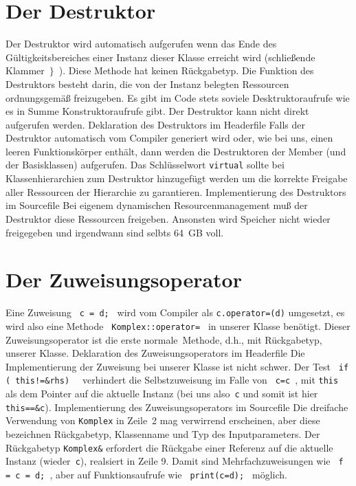 \section{Der Destruktor}
\label{p:9.3}
%
Der Destruktor wird automatisch aufgerufen wenn das Ende des Gültigkeitsbereiches
einer Instanz dieser Klasse erreicht wird (schließende Klammer~$\}$~).
Diese Methode hat keinen Rückgabetyp.
Die Funktion des Destruktors besteht darin, die von der Instanz belegten Ressourcen
ordnungsgemäß freizugeben. Es gibt im Code stets soviele Desktruktoraufrufe wie es in Summe
Konstruktoraufrufe gibt.
Der Destruktor kann nicht direkt aufgerufen werden.
%
{Deklaration des Destruktors im Headerfile}
%
Falls der Destruktor automatisch vom Compiler generiert wird oder, wie bei uns,
einen leeren Funktionskörper enthält, dann werden die Destruktoren der Member (und der Basisklassen)
aufgerufen. Das Schlüsselwort \verb|virtual| sollte bei Klassenhierarchien
zum Destruktor hinzugefügt werden um die korrekte Freigabe aller Ressourcen der Hierarchie
zu garantieren.
{Implementierung des Destruktors im Sourcefile}
%
Bei eigenem dynamischen Resourcenmanagement muß der Destruktor diese Ressourcen freigeben.
Ansonsten wird Speicher nicht wieder freigegeben und irgendwann sind selbts 64~GB voll.

%
\section{Der Zuweisungsoperator}
\label{p:9.4}
Eine Zuweisung \verb| c = d; | wird vom Compiler als \verb|c.operator=(d)| umgesetzt,
es wird also eine Methode \verb| Komplex::operator= | in unserer Klasse benötigt.
Dieser Zuweisungsoperator ist die erste \glqq normale\grqq\  Methode, d.h., mit Rückgabetyp,
unserer Klasse.
%
{Deklaration des Zuweisungsoperators im Headerfile}
%
Die Implementierung der Zuweisung bei unserer Klasse ist nicht schwer.
Der Test \verb| if ( this!=&rhs)  | verhindert die Selbstzuweisung im Falle von \verb| c=c |,
mit \texttt{this} als dem Pointer auf die aktuelle Instanz
(bei uns also~\texttt{c} und somit ist hier \verb|this==&c|).{}
%
{Implementierung des Zuweisungsoperators im Sourcefile}
%
Die dreifache Verwendung von \verb|Komplex| in Zeile~2 mag verwirrend erscheinen, aber diese
bezeichnen Rückgabetyp, Klassenname und Typ des Inputparameters.
Der Rückgabetyp \verb|Komplex&| erfordert die Rückgabe einer Referenz auf die aktuelle Instanz
(wieder~\texttt{c}), realsiert in Zeile 9.
Damit sind Mehrfachzuweisungen wie \verb| f = c = d; |, aber auf Funktionsaufrufe wie
\verb| print(c=d); | möglich.

